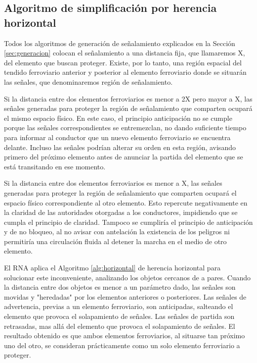     \subsection{Algoritmo de simplificación por herencia horizontal}
	\label{sec:horizontal}

Todos los algoritmos de generación de señalamiento explicados en la Sección \ref{sec:generacion} colocan el señalamiento a una distancia fija, que llamaremos X, del elemento que buscan proteger. Existe, por lo tanto, una región espacial del tendido ferroviario anterior y posterior al elemento ferroviario donde se situarán las señales, que denominaremos región de señalamiento. 

Si la distancia entre dos elementos ferroviarios es menor a 2X pero mayor a X, las señales generadas para proteger la región de señalamiento que comparten ocupará el mismo espacio físico. En este caso, el principio anticipación no se cumple porque las señales correspondientes se entremezclan, no dando suficiente tiempo para informar al conductor que un nuevo elemento ferroviario se encuentra delante. Incluso las señales podrían alterar su orden en esta región, avisando primero del próximo elemento antes de anunciar la partida del elemento que se está transitando en ese momento.

Si la distancia entre dos elementos ferroviarios es menor a X, las señales generadas para proteger la región de señalamiento que comparten ocupará el espacio físico correspondiente al otro elemento. Esto repercute negativamente en la claridad de las autoridades otorgadas a los conductores, impidiendo que se cumpla el principio de claridad. Tampoco se cumpliría el principio de anticipación y de no bloqueo, al no avisar con antelación la existencia de los peligros ni permitiría una circulación fluida al detener la marcha en el medio de otro elemento.

El RNA aplica el Algoritmo \ref{alg:horizontal} de herencia horizontal para solucionar este inconveniente, analizando los objetos cercanos de a pares. Cuando la distancia entre dos objetos es menor a un parámetro dado, las señales son movidas y "heredadas" por los elementos anteriores o posteriores. Las señales de advertencia, previas a un elemento ferroviario, son anticipadas, salteando el elemento que provoca el solapamiento de señales. Las señales de partida son retrasadas, mas allá del elemento que provoca el solapamiento de señales. El resultado obtenido es que ambos elementos ferroviarios, al situarse tan próximo uno del otro, se consideran prácticamente como un solo elemento ferroviario a proteger.

